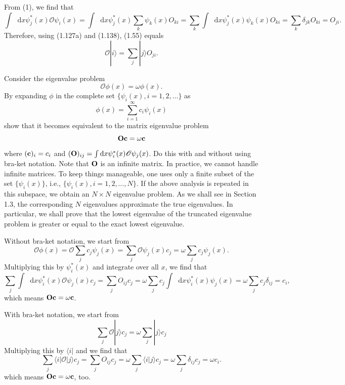 \documentclass[a4paper]{book}
\newcounter{exercise}[chapter]
\newcounter{solution}[chapter]
\newcommand*{\dif}{\mathop{}\!\mathrm{d}}
\newcommand{\Op}{{\bf O}}
\begin{document}
	\begin{solution}
	
	From (1), we find that
	\[
		\int \dif x \psi^*_j(x) \mathscr{O} \psi_i(x) = \int \dif x \psi^*_j(x) \sum_{k} \psi_k(x) O_{ki} = \sum_{k} \int \dif x \psi^*_j(x) \psi_k(x) O_{ki} = \sum_{k} \delta_{jk} O_{ki} = O_{ji} .
	\]
	Therefore, using (1.127a) and (1.138), (1.55) equals
	\[
		\mathscr{O} | i \rangle = \sum_j | j \rangle O_{ji} .
	\]
	
	\end{solution}	
	
	\begin{exercise}
	Consider the eigenvalue problem
	\[
		\mathscr{O} \phi(x) = \omega \phi(x).
	\]
	By expanding $\phi$ in the complete set $\{\psi_i(x),i=1,2,\ldots\}$ as
	\begin{equation*}
		\phi(x) = \sum_{i=1}^\infty c_i \psi_i(x)
	\end{equation*}
	show that it becomes equivalent to the matrix eigenvalue problem
	\begin{equation*}
		\Op {\bf c} = \omega {\bf c}
	\end{equation*}
	where $({\bf c})_i=c_i$ and $({\bf O})_{ij} = \int \dif x \psi^*_i(x)\mathscr{O}\psi_j(x)$. Do this with and without using bra-ket notation. Note that $\Op$ is an infinite matrix. In practice, we cannot handle infinite matrices. To keep things manageable, one uses only a finite subset of the set $\{\psi_i(x)\}$, i.e., $\{\psi_i(x),i=1,2,\ldots, N\}$. If the above analysis is repeated in this subspace, we obtain an $N \times N$ eigenvalue problem. As we shall see in Section 1.3, the corresponding $N$ eigenvalues approximate the true eigenvalues. In particular, we shall prove that the lowest eigenvalue of the truncated eigenvalue problem is greater or equal to the exact lowest eigenvalue.
	\end{exercise}
	
	\begin{solution}
	
	Without bra-ket notation, we start from
	\[
		\mathscr{O} \phi(x) = \mathscr{O} \sum_j c_j \psi_j(x) = \sum_j \mathscr{O} \psi_j(x) c_j = \omega \sum_j c_j \psi_j(x) .
	\]
	Multiplying this by $\psi^*_i(x)$ and integrate over all $x$, we find that
	\[
		\sum_j \int \dif x \psi^*_i(x) \mathscr{O} \psi_j(x) c_j = \sum_j O_{ij} c_j = \omega \sum_j c_j \int \dif x \psi^*_i(x) \psi_j(x) = \omega \sum_j c_j \delta_{ij} = c_i ,
	\]
	which means $\Op {\bf c} = \omega {\bf c}$.
	
	With bra-ket notation, we start from
	\[
		\sum_j \mathscr{O} | j \rangle c_j = \omega \sum_j | j \rangle c_j
	\]
	Multiplying this by $\langle i |$ and we find that
	\[
		\sum_j \langle i | \mathscr{O} | j \rangle c_j = \sum_j O_{ij} c_j = \omega \sum_j \langle i | j \rangle c_j = \omega \sum_j \delta_{ij} c_j = \omega c_i .
	\]
	which means $\Op {\bf c} = \omega {\bf c}$, too.
	\end{solution}
	
\end{document}
